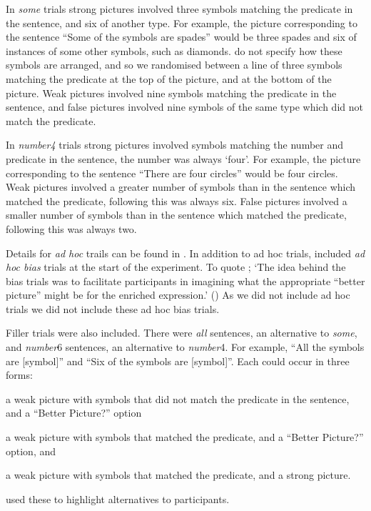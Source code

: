 \documentclass[10pt]{article}
\begin{document}
\begin{multicols}{2}
In \emph{some} trials strong pictures involved three symbols matching the predicate in the sentence, and six of another type.
For example, the picture corresponding to the sentence ``Some of the symbols are spades'' would be three spades and six of instances of some other symbols, such as diamonds.
\citeauthor{Bott:2016aa} do not specify how these symbols are arranged, and so we randomised between a line of three symbols matching the predicate at the top of the picture, and at the bottom of the picture.
Weak pictures involved nine symbols matching the predicate in the sentence, and false pictures involved nine symbols of the same type which did not match the predicate.

In \emph{number4} trials strong pictures involved symbols matching the number and predicate in the sentence, the number was always `four'.
For example, the picture corresponding to the sentence ``There are four circles'' would be four circles.
Weak pictures involved a greater number of symbols than in the sentence which matched the predicate, following \citeauthor{Bott:2016aa} this was always six.
False pictures involved a smaller number of symbols than in the sentence which matched the predicate, following \citeauthor{Bott:2016aa} this was always two.

Details for \emph{ad hoc} trails can be found in \textcite[123--124]{Bott:2016aa}.
In addition to ad hoc trials, \citeauthor{Bott:2016aa} included \emph{ad hoc bias} trials at the start of the experiment.
To quote \citeauthor{Bott:2016aa}; `The idea behind the bias trials was to facilitate participants in imagining what the appropriate ``better picture'' might be for the enriched expression.' (\citeyear[124]{Bott:2016aa})
As we did not include ad hoc trials we did not include these ad hoc bias trials.

Filler trials were also included.
There were \emph{all} sentences, an alternative to \emph{some}, and \emph{number}6 sentences, an alternative to \emph{number}4.
For example, ``All the symbols are [symbol]'' and ``Six of the symbols are [symbol]''.
Each could occur in three forms:
\begin{enumerate*}[label=(\arabic*)]
\item a weak picture with symbols that did not match the predicate in the sentence, and a ``Better Picture?'' option
\item a weak picture with symbols that matched the predicate, and a ``Better Picture?'' option, and
\item a weak picture with symbols that matched the predicate, and a strong picture.
\end{enumerate*}
\citeauthor{Bott:2016aa} used these to highlight alternatives to participants.


\end{multicols}
\end{document}
